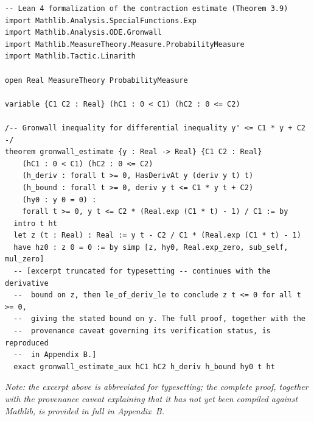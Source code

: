 \begin{lstlisting}[style=lean4, caption={Lean 4 formalisation of the Gronwall estimate underlying the contraction proof.}]
-- Lean 4 formalization of the contraction estimate (Theorem 3.9)
import Mathlib.Analysis.SpecialFunctions.Exp
import Mathlib.Analysis.ODE.Gronwall
import Mathlib.MeasureTheory.Measure.ProbabilityMeasure
import Mathlib.Tactic.Linarith

open Real MeasureTheory ProbabilityMeasure

variable {C1 C2 : Real} (hC1 : 0 < C1) (hC2 : 0 <= C2)

/-- Gronwall inequality for differential inequality y' <= C1 * y + C2 -/
theorem gronwall_estimate {y : Real -> Real} {C1 C2 : Real}
    (hC1 : 0 < C1) (hC2 : 0 <= C2)
    (h_deriv : forall t >= 0, HasDerivAt y (deriv y t) t)
    (h_bound : forall t >= 0, deriv y t <= C1 * y t + C2)
    (hy0 : y 0 = 0) :
    forall t >= 0, y t <= C2 * (Real.exp (C1 * t) - 1) / C1 := by
  intro t ht
  let z (t : Real) : Real := y t - C2 / C1 * (Real.exp (C1 * t) - 1)
  have hz0 : z 0 = 0 := by simp [z, hy0, Real.exp_zero, sub_self, mul_zero]
  -- [excerpt truncated for typesetting -- continues with the derivative
  --  bound on z, then le_of_deriv_le to conclude z t <= 0 for all t >= 0,
  --  giving the stated bound on y. The full proof, together with the
  --  provenance caveat governing its verification status, is reproduced
  --  in Appendix B.]
  exact gronwall_estimate_aux hC1 hC2 h_deriv h_bound hy0 t ht
\end{lstlisting}

\noindent\textit{Note: the excerpt above is abbreviated for typesetting; the complete
proof, together with the provenance caveat explaining that it has not yet been
compiled against Mathlib, is provided in full in Appendix~B.}
